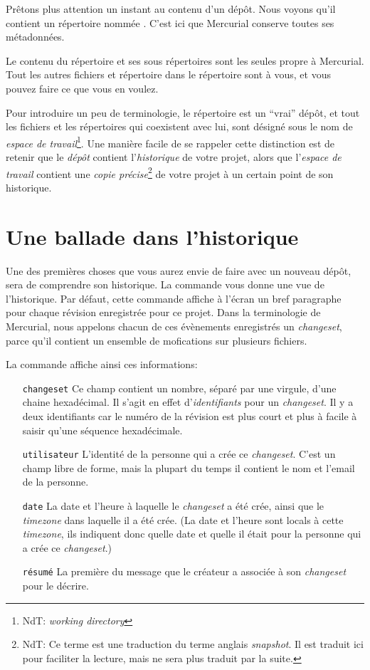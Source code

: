 Prêtons plus attention un instant au contenu d'un dépôt. Nous voyons 
qu'il contient un répertoire nommée . C'est ici que Mercurial
conserve toutes ses métadonnées.

Le contenu du répertoire  et ses sous répertoires sont les
seules propre à Mercurial. Tout les autres fichiers et répertoire dans 
le répertoire sont à vous, et vous pouvez faire ce que vous en voulez.

Pour introduire un peu de terminologie, le répertoire  est
un ``vrai'' dépôt, et tout les fichiers et les répertoires qui coexistent
avec lui, sont désigné sous le nom de \emph{espace de travail}\footnote{NdT: 
\textit{working directory}}. Une manière facile de se rappeler cette 
distinction est de retenir que le \emph{dépôt} contient l'\emph{historique}
de votre projet, alors que l'\emph{espace de travail} contient une \emph{copie
précise}\footnote{NdT: Ce terme est une traduction du terme anglais 
\textit{snapshot}. Il est traduit ici pour faciliter la lecture, mais ne sera
plus traduit par la suite.} de votre projet à un certain point de son
historique.

\section{Une ballade dans l'historique}

Une des premières choses que vous aurez envie de faire avec un nouveau
dépôt, sera de comprendre son historique. La commande  vous
donne une vue de l'historique.
Par défaut, cette commande affiche à l'écran un bref paragraphe pour chaque
révision enregistrée pour ce projet. Dans la terminologie de Mercurial, nous
appelons chacun de ces évènements enregistrés un \emph{changeset}, parce 
qu'il contient un ensemble de mofications sur plusieurs fichiers.

La commande  affiche ainsi ces informations:
\begin{itemize}
\item[\texttt{changeset}] Ce champ contient un nombre, séparé par une 
  virgule, d'une chaine hexadécimal. Il s'agit en effet d'\emph{identifiants}
  pour un \textit{changeset}. Il y a deux identifiants car le numéro de
  la révision est plus court et plus à facile à saisir qu'une séquence
  hexadécimale.
\item[\texttt{utilisateur}] L'identité de la personne qui a crée ce 
  \textit{changeset}. C'est un champ libre de forme, mais la plupart du
  temps il contient le nom et l'email de la personne.
\item[\texttt{date}] La date et l'heure à laquelle le \textit{changeset}
  a été crée, ainsi que le \textit{timezone} dans laquelle il a été crée. %
  (La date et l'heure sont locals à cette \textit{timezone}, ils indiquent
  donc quelle date et quelle il était pour la personne qui a crée ce 
  \textit{changeset}.)
\item[\texttt{résumé}] La première du message que le créateur a associée à
  son \textit{changeset} pour le décrire.
\end{itemize}


